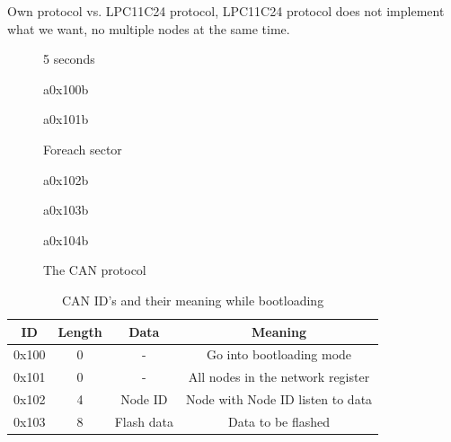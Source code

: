\documentclass[twocolumn]{article}
\begin{document}
		Own protocol vs. LPC11C24 protocol, LPC11C24 protocol does not implement what we want, no multiple nodes at the same time.
		\begin{figure}[h]
			\centering
			\begin{sequencediagram}
				
				\begin{sdloop}{5 seconds}
					\begin{call}{a}{0x100}{b}{}
					\end{call}
				\end{sdloop}
				
				\begin{call}{a}{0x101}{b}{}
				\end{call}
				
				\begin{sdloop}{Foreach sector}
					\begin{call}{a}{0x102}{b}{} %
					\end{call}
				\end{sdloop}
				\begin{call}{a}{0x103}{b}{} %
				\end{call}
				\begin{call}{a}{0x104}{b}{} %
				\end{call}
				
				
			\end{sequencediagram}
			\caption{The CAN protocol}
		\end{figure}
		
		\begin{table}[ht]
			\caption{CAN ID's and their meaning while bootloading}
			
			\centering
			\begin{tabular}{|c|c|c|c|}
				\hline
				\textbf{ID} & \textbf{Length} & \textbf{Data} & \textbf{Meaning} \\ \hline
				0x100 & 0 & - & Go into bootloading mode \\ \hline
				0x101 & 0 & - & All nodes in the network register \\ \hline
				0x102 & 4 & Node ID & Node with Node ID listen to data \\ \hline
				0x103 & 8 & Flash data & Data to be flashed \\ \hline
			\end{tabular}
		\end{table}
	
\end{document}
